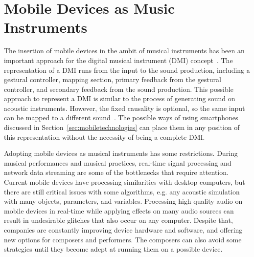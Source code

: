 \section{Mobile Devices as Music Instruments}
\label{sec:mobileinstruments}

The insertion of mobile devices in the ambit of musical instruments has been an important approach for the digital musical instrument (DMI) concept~\citep{miranda2006newdigitalmusical}.
The representation of a DMI runs from the input to the sound production, including a gestural controller, mapping section, primary feedback from the gestural controller, and secondary feedback from the sound production.
This possible approach to represent a DMI is similar to the process of generating sound on acoustic instruments.
However, the fixed causality is optional, so the same input can be mapped to a different sound~\citep{miranda2006newdigitalmusical}.
The possible ways of using smartphones discussed in Section~\ref{sec:mobiletechnologies} can place them in any position of this representation without the necessity of being a complete DMI.

Adopting mobile devices as musical instruments has some restrictions.
During musical performances and musical practices, real-time signal processing and network data streaming are some of the bottlenecks that require attention.
Current mobile devices have processing similarities with desktop computers, but there are still critical issues with some algorithms, e.g. any acoustic simulation with many objects, parameters, and variables.
Processing high quality audio on mobile devices in real-time while applying effects on many audio sources can result in undesirable glitches that also occur on any computer.
Despite that, companies are constantly improving device hardware and software, and offering new options for composers and performers.
The composers can also avoid some strategies until they become adept at running them on a possible device.

